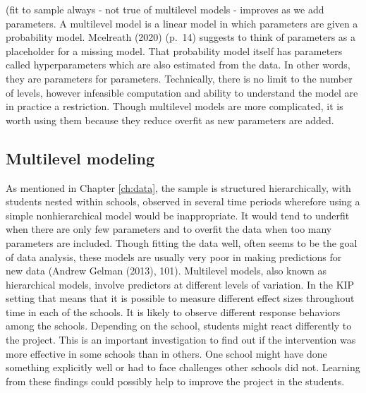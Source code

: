 \documentclass[a4, 12pt]{article}
\begin{document}
(fit to sample always - not true of multilevel models - improves as we add parameters.
A multilevel model is a linear model in which parameters are given a probability model. Mcelreath (2020) (p.~14) suggests to think of parameters as a placeholder for a missing model. That probability model itself has parameters called hyperparameters which are also estimated from the data. In other words, they are parameters for parameters. Technically, there is no limit to the number of levels, however infeasible computation and ability to understand the model are in practice a restriction. Though multilevel models are more complicated, it is worth using them because they reduce overfit as new parameters are added.

\hypertarget{multilevel-modeling}{%
\subsection{Multilevel modeling}\label{multilevel-modeling}}

As mentioned in Chapter \ref{ch:data}, the sample is structured hierarchically, with students nested within schools, observed in several time periods wherefore using a simple nonhierarchical model would be inappropriate. It would tend to underfit when there are only few parameters and to overfit the data when too many parameters are included. Though fitting the data well, often seems to be the goal of data analysis, these models are usually very poor in making predictions for new data (Andrew Gelman (2013), 101). Multilevel models, also known as hierarchical models, involve predictors at different levels of variation. In the KIP setting that means that it is possible to measure different effect sizes throughout time in each of the schools. It is likely to observe different response behaviors among the schools. Depending on the school, students might react differently to the project. This is an important investigation to find out if the intervention was more effective in some schools than in others. One school might have done something explicitly well or had to face challenges other schools did not. Learning from these findings could possibly help to improve the project in the students.
\end{document}
